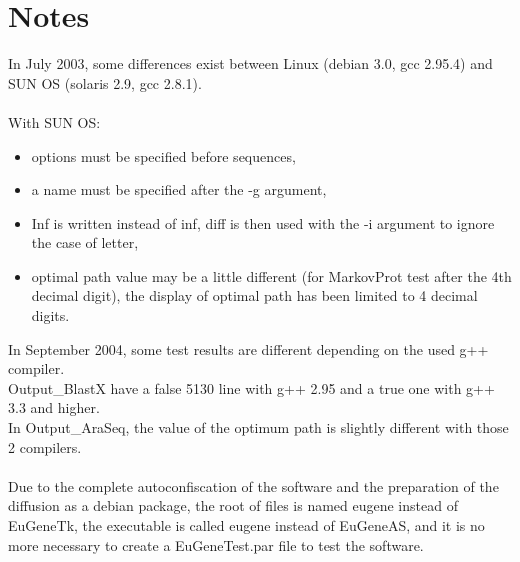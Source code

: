 \documentclass[a4paper,11pt]{article}
\begin{document}
\section{Notes}
In July 2003, some differences exist between Linux (debian 3.0, gcc 2.95.4) and SUN OS (solaris 2.9, gcc 2.8.1). \\
\\
With SUN OS:
\begin{itemize}
\item options must be specified before sequences,
\item a name must be specified after the -g argument,
\item Inf is written instead of inf, diff is then used with the -i argument to ignore the case of letter,
\item optimal path value may be a little different (for MarkovProt test after the 4th decimal digit), the display of optimal path has been limited to 4 decimal digits.
\end{itemize}

In September 2004, some test results are different depending on the used g++ compiler.\\
Output\_BlastX have a false 5130 line with g++ 2.95 and a true one with g++ 3.3 and higher.\\
In Output\_AraSeq, the value of the optimum path is slightly different with those 2 compilers.\\
\\
Due to the complete autoconfiscation of the software and the preparation of the diffusion as a debian package, the root of files is named eugene instead of EuGeneTk, the executable is called eugene instead of EuGeneAS, and it is no more necessary to create a EuGeneTest.par file to test the software.\\
\end{document}
